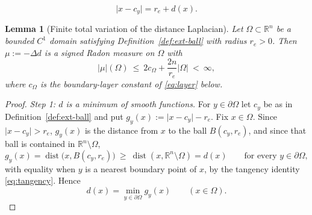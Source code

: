 \documentclass[10pt,a4paper]{amsart}
\newtheorem{lemma}{Lemma}
\newcommand{\R}{\mathbb R}
\newcommand{\abs}[1]{\lvert #1\rvert}
\newcommand{\dist}{\operatorname{dist}}
\begin{document}
\begin{equation}\label{eq:tangency}
\abs{x-c_y}=r_e+d(x).
\end{equation}

\begin{lemma}[Finite total variation of the distance Laplacian]\label{lem:tv-exterior-ball}
Let $\Omega\subset\R^n$ be a bounded $C^1$ domain satisfying
Definition~\ref{def:ext-ball} with radius $r_e>0$. Then $\mu:=-\Delta d$ is a
signed Radon measure on $\Omega$ with
\[
\abs{\mu}(\Omega)\ \le\ 2c_\Omega+\frac{2n}{r_e}\abs{\Omega}\ <\ \infty,
\]
where $c_\Omega$ is the boundary-layer constant of \eqref{eq:layer} below.
\end{lemma}

\begin{proof}
\emph{Step 1: $d$ is a minimum of smooth functions.}
For $y\in\partial\Omega$ let $c_y$ be as in Definition~\ref{def:ext-ball} and
put $g_y(x):=\abs{x-c_y}-r_e$. Fix $x\in\Omega$. Since $\abs{x-c_y}>r_e$,
$g_y(x)$ is the distance from $x$ to the ball $B(c_y,r_e)$, and since that
ball is contained in $\R^n\setminus\Omega$,
\[
g_y(x)=\dist\bigl(x,B(c_y,r_e)\bigr)\ \ge\ \dist(x,\R^n\setminus\Omega)=d(x)
\qquad\text{for every }y\in\partial\Omega,
\]
with equality when $y$ is a nearest boundary point of $x$, by the tangency
identity \eqref{eq:tangency}. Hence
\begin{equation}\label{eq:d-as-min}
d(x)=\min_{y\in\partial\Omega}g_y(x)\qquad(x\in\Omega).
\end{equation}


\end{proof}
\end{document}
